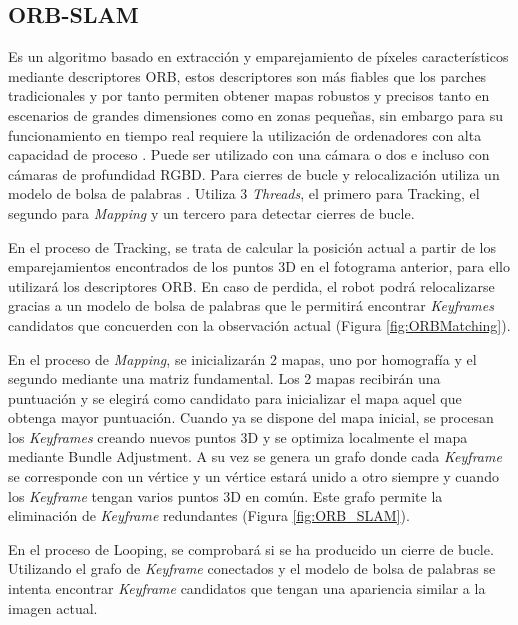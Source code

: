 \clearpage

\subsection{ORB-SLAM}
Es un algoritmo basado en extracción y emparejamiento de píxeles característicos mediante descriptores ORB, estos descriptores son más fiables que los parches tradicionales y por tanto permiten obtener mapas robustos y precisos tanto en escenarios de grandes dimensiones como en zonas pequeñas, sin embargo para su funcionamiento en tiempo real requiere la utilización de ordenadores con alta capacidad de proceso \cite{Mur2015orb}.
Puede ser utilizado con una cámara o dos e incluso con cámaras de profundidad RGBD. Para cierres de bucle y relocalización utiliza un modelo de bolsa de palabras \cite{galvez2012bags}.
Utiliza 3 \textit{Threads}, el primero para Tracking, el segundo para \textit{Mapping} y un tercero para detectar cierres de bucle. 

En el proceso de Tracking, se trata de calcular la posición actual a partir de los emparejamientos encontrados de los puntos 3D en el fotograma anterior, para ello utilizará los descriptores ORB.
En caso de perdida, el robot podrá relocalizarse gracias a un modelo de bolsa de palabras que le permitirá encontrar \textit{Keyframes} candidatos que concuerden con la observación actual (Figura \ref{fig:ORBMatching}).

En el proceso de \textit{Mapping}, se inicializarán 2 mapas, uno por homografía y el segundo mediante una matriz fundamental. Los 2 mapas recibirán una puntuación y se elegirá como candidato para inicializar el mapa aquel que obtenga mayor puntuación. Cuando ya se dispone del mapa inicial, se procesan los \textit{Keyframes} creando nuevos puntos 3D y se optimiza localmente el mapa mediante Bundle Adjustment. A su vez se genera un grafo donde cada \textit{Keyframe} se corresponde con un vértice y un vértice estará unido a otro siempre y cuando los \textit{Keyframe} tengan varios puntos 3D en común. Este grafo permite la eliminación de \textit{Keyframe} redundantes (Figura \ref{fig:ORB_SLAM}).

En el proceso de Looping, se comprobará si se ha producido un cierre de bucle. Utilizando el grafo de \textit{Keyframe} conectados y el modelo de bolsa de palabras se intenta encontrar \textit{Keyframe} candidatos que tengan una apariencia similar a la imagen actual.

